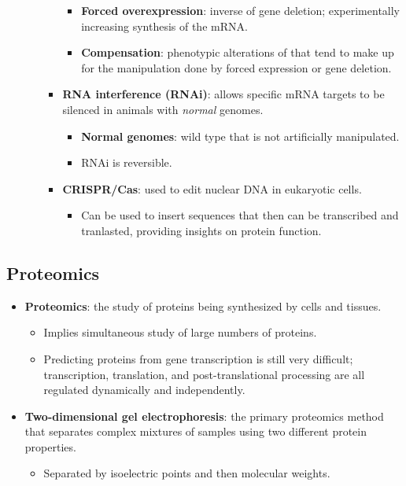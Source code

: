 \documentclass[12pt,a4paper]{article}
\begin{document}
\begin{itemize}
\begin{itemize}
\begin{itemize}
                    \begin{itemize}
                        \item \textbf{Forced overexpression}: inverse of gene deletion; experimentally increasing synthesis of the mRNA.
                        \item \textbf{Compensation}: phenotypic alterations of that tend to make up for the manipulation done by forced expression or gene deletion.
                    \end{itemize}
                    \item \textbf{RNA interference (RNAi)}: allows specific mRNA targets to be silenced in animals with \textit{normal} genomes.
                        \begin{itemize}
                            \item \textbf{Normal genomes}: wild type that is not artificially manipulated.
                            \item RNAi is reversible.
                        \end{itemize}
                    \item \textbf{CRISPR/Cas}: used to edit nuclear DNA in eukaryotic cells.
                        \begin{itemize}
                            \item Can be used to insert sequences that then can be transcribed and tranlasted, providing insights on protein function.
                        \end{itemize}
                \end{itemize}
        \end{itemize}
\end{itemize}

\subsection{Proteomics}
\begin{itemize}
    \item \textbf{Proteomics}: the study of proteins being synthesized by cells and tissues.
        \begin{itemize}
            \item Implies simultaneous study of large numbers of proteins.
            \item Predicting proteins from gene transcription is still very difficult; transcription, translation, and post-translational processing are all regulated dynamically and independently.
        \end{itemize}
    \item \textbf{Two-dimensional gel electrophoresis}: the primary proteomics method that separates complex mixtures of samples using two different protein properties.
        \begin{itemize}
            \item Separated by {\color{o-Sun}isoelectric points} and then {\color{o-Sun}molecular weights}.
        \end{itemize}
\end{itemize}
\end{document}
